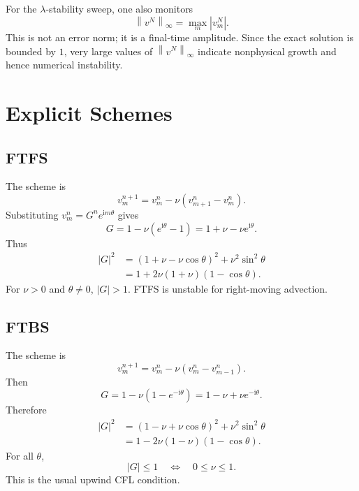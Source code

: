\documentclass[11pt]{article}
\newcommand{\ii}{\mathrm{i}}
\newcommand{\norm}[1]{\left\lVert #1\right\rVert}
\begin{document}
For the $\lambda$-stability sweep, one also monitors
\begin{equation}
    \norm{v^N}_\infty=\max_m |v_m^N|.
\end{equation}
This is not an error norm; it is a final-time amplitude.  Since the exact solution is
bounded by $1$, very large values of $\norm{v^N}_\infty$ indicate nonphysical growth
and hence numerical instability.

\section{Explicit Schemes}

\subsection{FTFS}

The scheme is
\begin{equation}
    v_m^{n+1}=v_m^n-\nu(v_{m+1}^n-v_m^n).
\end{equation}
Substituting $v_m^n=G^n e^{\ii m\theta}$ gives
\begin{equation}
    G=1-\nu(e^{\ii\theta}-1)
    =
    1+\nu-\nu e^{\ii\theta}.
\end{equation}
Thus
\begin{align}
    |G|^2
    &=
    (1+\nu-\nu\cos\theta)^2+\nu^2\sin^2\theta\\
    &=
    1+2\nu(1+\nu)(1-\cos\theta).
\end{align}
For $\nu>0$ and $\theta\ne0$, $|G|>1$.  FTFS is unstable for right-moving advection.

\subsection{FTBS}

The scheme is
\begin{equation}
    v_m^{n+1}=v_m^n-\nu(v_m^n-v_{m-1}^n).
\end{equation}
Then
\begin{equation}
    G=1-\nu(1-e^{-\ii\theta})
    =
    1-\nu+\nu e^{-\ii\theta}.
\end{equation}
Therefore
\begin{align}
    |G|^2
    &=
    (1-\nu+\nu\cos\theta)^2+\nu^2\sin^2\theta\\
    &=
    1-2\nu(1-\nu)(1-\cos\theta).
\end{align}
For all $\theta$,
\begin{equation}
    |G|\le1
    \quad\Longleftrightarrow\quad
    0\le\nu\le1.
\end{equation}
This is the usual upwind CFL condition.
\end{document}
